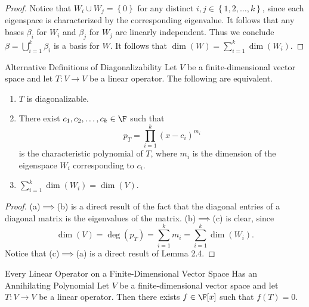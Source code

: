 \documentclass[linearalgebraII]{subfiles}
\begin{document}
    \begin{proof}
        Notice that $W_i\cup W_j = \left\lbrace 0 \right\rbrace$ for any distinct $i,j\in \left\lbrace 1, 2, \ldots, k \right\rbrace$, since each eigenspace is characterized by the corresponding eigenvalue. It follows that any bases $\beta_i$ for $W_i$ and $\beta_j$ for $W_j$ are linearly independent. Thus we conclude $\beta=\bigcup^{k}_{i=1} \beta_i$ is a basis for $W$. It follows that $\dim \left( W \right) = \sum^{k}_{i=1} \dim(W_i)$. 
    \end{proof}

    \begin{prop}{Alternative Definitions of Diagonalizability}
        Let $V$ be a finite-dimensional vector space and let $T:V\to V$ be a linear operator. The following are equivalent.
        \begin{enumerate}
            \item $T$ is diagonalizable.
            \item There exist $c_1, c_2, \ldots, c_k\in \F$ such that
                \begin{equation*}
                    p_T = \prod^{k}_{i=1} (x-c_i)^{m_i}
                \end{equation*}
                is the characteristic polynomial of $T$, where $m_i$ is the dimension of the eigenspace $W_i$ corresponding to $c_i$.
            \item $\sum^{k}_{i=1} \dim(W_i) = \dim(V)$.
        \end{enumerate}
    \end{prop}

    \begin{proof}
        (a)$\implies$(b) is a direct result of the fact that the diagonal entries of a diagonal matrix is the eigenvalues of the matrix. (b)$\implies$(c) is clear, since
        \begin{equation*}
            \dim(V) = \deg(p_T) = \sum^{k}_{i=1} m_i = \sum^{k}_{i=1} \dim(W_i).  
        \end{equation*}
        Notice that (c)$\implies$(a) is a direct result of Lemma 2.4.
    \end{proof}

    \begin{prop}{Every Linear Operator on a Finite-Dimensional Vector Space Has an Annihilating Polynomial}
        Let $V$ be a finite-dimensional vector space and let $T:V\to V$ be a linear operator. Then there exists $f\in \F[x]$ such that $f(T) = 0$.
    \end{prop}
\end{document}
